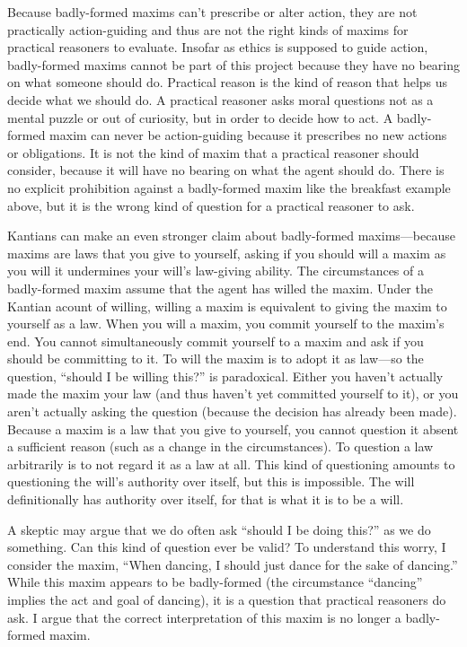 \begin{isabellebody}
\begin{isamarkuptext}
Because badly-formed maxims can't prescribe or alter action, they are not practically action-guiding and 
thus are not the right kinds of maxims for practical reasoners to evaluate. Insofar as ethics 
is supposed to guide action, badly-formed maxims cannot be part of this project because they
have no bearing on what someone should do. Practical reason is the kind of reason that helps us decide 
what we should do. A practical reasoner asks moral questions not as a mental puzzle or out of curiosity, but 
in order to decide how to act. A badly-formed maxim can never be action-guiding because it prescribes no new
actions or obligations. It is not the kind of maxim that a practical reasoner should consider, because it
will have no bearing on what the agent should do. There is no explicit prohibition against a badly-formed maxim 
like the breakfast example above, but it is the wrong kind of question for a practical reasoner to ask. 

Kantians can make an even stronger claim about badly-formed maxims—because maxims are laws that you 
give to yourself, asking if you should will a maxim as you will it undermines your will's law-giving 
ability. The circumstances of a badly-formed maxim assume that the agent has willed the maxim. Under 
the Kantian acount of willing, willing a maxim is equivalent to giving the maxim to yourself as a law. 
When you will a maxim, you commit yourself to the maxim's end. You cannot simultaneously 
commit yourself to a maxim and ask if you should be committing to it. To will the maxim is to adopt it as 
law—so the question, ``should I be willing this?'' is paradoxical. Either you haven't actually made 
the maxim your law (and thus haven't yet committed yourself to it), or you aren't actually asking 
the question (because the decision has already been made). Because a maxim is a law that you give to 
yourself, you cannot question it absent a sufficient reason (such as a change in the circumstances). 
To question a law arbitrarily is to not regard it as a law at all. This kind of questioning amounts to 
questioning the will's authority over itself, but this is impossible. The will definitionally has authority 
over itself, for that is what it is to be a will. 

A skeptic may argue that we do often ask ``should I be doing this?'' as we do something. 
Can this kind of question ever be valid? To understand this worry, I consider the maxim, 
``When dancing, I should just dance for the sake of dancing.'' While this maxim appears to be badly-formed (the 
circumstance ``dancing'' implies the act and goal of dancing), it is a question that practical reasoners 
do ask. I argue that the correct interpretation of this maxim is no longer a badly-formed maxim.


\end{isamarkuptext}
\end{isabellebody}
